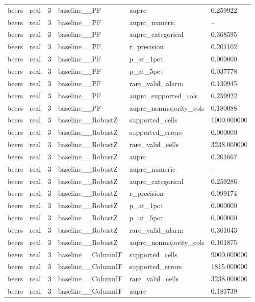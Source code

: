 \begin{tabular}{llllll}
beers & real & 3 & baseline\_\_PF & auprc & 0.259922 \\
beers & real & 3 & baseline\_\_PF & auprc\_numeric & -- \\
beers & real & 3 & baseline\_\_PF & auprc\_categorical & 0.368595 \\
beers & real & 3 & baseline\_\_PF & r\_precision & 0.201102 \\
beers & real & 3 & baseline\_\_PF & p\_at\_1pct & 0.000000 \\
beers & real & 3 & baseline\_\_PF & p\_at\_5pct & 0.037778 \\
beers & real & 3 & baseline\_\_PF & rare\_valid\_alarm & 0.130945 \\
beers & real & 3 & baseline\_\_PF & auprc\_supported\_cols & 0.259922 \\
beers & real & 3 & baseline\_\_PF & auprc\_nonmajority\_cols & 0.180088 \\
beers & real & 3 & baseline\_\_RobustZ & supported\_cells & 1000.000000 \\
beers & real & 3 & baseline\_\_RobustZ & supported\_errors & 0.000000 \\
beers & real & 3 & baseline\_\_RobustZ & rare\_valid\_cells & 3238.000000 \\
beers & real & 3 & baseline\_\_RobustZ & auprc & 0.201667 \\
beers & real & 3 & baseline\_\_RobustZ & auprc\_numeric & -- \\
beers & real & 3 & baseline\_\_RobustZ & auprc\_categorical & 0.259286 \\
beers & real & 3 & baseline\_\_RobustZ & r\_precision & 0.099174 \\
beers & real & 3 & baseline\_\_RobustZ & p\_at\_1pct & 0.000000 \\
beers & real & 3 & baseline\_\_RobustZ & p\_at\_5pct & 0.000000 \\
beers & real & 3 & baseline\_\_RobustZ & rare\_valid\_alarm & 0.361643 \\
beers & real & 3 & baseline\_\_RobustZ & auprc\_nonmajority\_cols & 0.101875 \\
beers & real & 3 & baseline\_\_ColumnIF & supported\_cells & 9000.000000 \\
beers & real & 3 & baseline\_\_ColumnIF & supported\_errors & 1815.000000 \\
beers & real & 3 & baseline\_\_ColumnIF & rare\_valid\_cells & 3238.000000 \\
beers & real & 3 & baseline\_\_ColumnIF & auprc & 0.183739 \\

\end{tabular}
